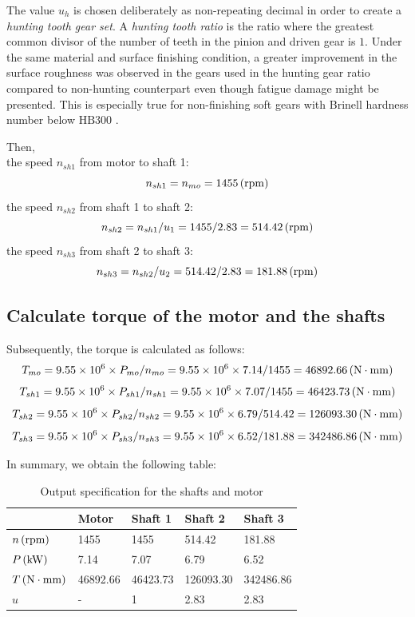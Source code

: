 The value $ u_h $ is chosen deliberately as non-repeating decimal in order to create a \textit{hunting tooth gear set}. A \textit{hunting tooth ratio} is the ratio where the greatest common divisor of the number of teeth in the pinion and driven gear is $ 1 $. Under the same material and surface finishing condition, a greater improvement in the surface roughness was observed in the gears used in the hunting gear ratio compared to non-hunting counterpart even though fatigue damage might be presented. This is especially true for non-finishing soft gears with Brinell hardness number below $ \text{HB}300 $  \cite{Ishibashi1981}.

Then,\\
the speed $ n_{sh1} $ from motor to shaft 1: \[ n_{sh1} = n_{mo} = 1455 \, (\mathrm{rpm})\]
the speed $ n_{sh2} $ from shaft 1 to shaft 2: \[ n_{sh2} = {n_{sh1}}/{u_1} = 1455/2.83 = 514.42 \, (\mathrm{rpm})\]
the speed $ n_{sh3} $ from shaft 2 to shaft 3: \[ n_{sh3} = {n_{sh2}}/{u_2} = 514.42/2.83 = 181.88 \, (\mathrm{rpm})\]

\subsection{Calculate torque of the motor and the shafts}
Subsequently, the torque is calculated as follows:\\
\[ T_{mo}  = 9.55\times10^6 \times P_{mo}/n_{mo} = 9.55\times10^6 \times 7.14/1455 = 46892.66 \, (\mathrm{N\cdot mm})\]
\[ T_{sh1} = 9.55\times10^6 \times {P_{sh1}}/{n_{sh1}} = 9.55\times10^6 \times 7.07/1455 = 46423.73 \, (\mathrm{N\cdot mm})\]
\[ T_{sh2} = 9.55\times10^6 \times {P_{sh2}}/{n_{sh2}} = 9.55\times10^6 \times 6.79/514.42 = 126093.30 \, (\mathrm{N\cdot mm})\]
\[ T_{sh3} = 9.55\times10^6 \times {P_{sh3}}/{n_{sh3}} = 9.55\times10^6 \times 6.52/181.88 = 342486.86 \, (\mathrm{N\cdot mm})\]

In summary, we obtain the following table:
\begin{table}[ht]
	\centering
	\caption{Output specification for the shafts and motor}
	\begin{tabular}{lllll}\toprule
		&Motor    & Shaft 1  & Shaft 2  & Shaft 3   \\\midrule
		$ n \, (\mathrm{rpm})$ & 1455 & 1455  & 514.42 & 181.88 \\
		$ P \, (\mathrm{kW})$ & 7.14  & 7.07   & 6.79   & 6.52   \\
		$ T \, (\mathrm{N\cdot mm})$ & 46892.66 & 46423.73 & 126093.30 & 342486.86\\
		$ u $ &       -   &1    &  2.83  & 2.83            \\
		\bottomrule
	\end{tabular}
	\label{tab:my-table}
\end{table}